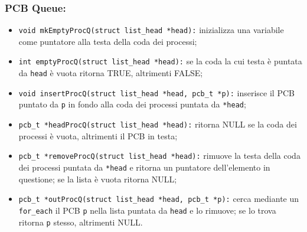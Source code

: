 \documentclass{article}
\begin{document}
	\subsubsection{PCB Queue:}
	\begin{itemize}
		\item \texttt{void mkEmptyProcQ(struct list\_head *head):} inizializza una
			variabile come puntatore alla testa della coda dei processi;

		\item \texttt{int emptyProcQ(struct list\_head *head):} se la coda la cui
			testa è puntata da \texttt{head} è vuota ritorna TRUE, altrimenti FALSE;

		\item \texttt{void insertProcQ(struct list\_head *head, pcb\_t *p):}
			inserisce il PCB puntato da \texttt{p} in fondo alla coda dei processi puntata
			da \texttt{*head};

		\item \texttt{pcb\_t *headProcQ(struct list\_head *head):} ritorna NULL se
			la coda dei processi è vuota, altrimenti il PCB in testa;

		\item \texttt{pcb\_t *removeProcQ(struct list\_head *head):} rimuove la
			testa della coda dei processi puntata da \texttt{*head} e ritorna un puntatore
			dell'elemento in questione; se la lista è vuota ritorna NULL;

		\item \texttt{pcb\_t *outProcQ(struct list\_head *head, pcb\_t *p):} cerca
			mediante un \texttt{for\_each} il PCB \texttt{p} nella lista puntata da
			\texttt{head} e lo rimuove; se lo trova ritorna \texttt{p} stesso,
			altrimenti NULL.
	\end{itemize}
	\newpage
\end{document}
